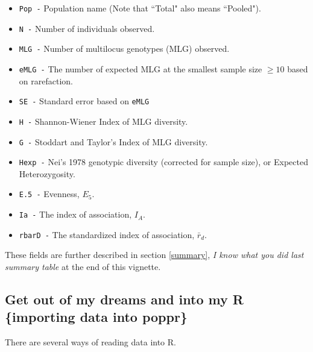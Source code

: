 \documentclass[letterpaper]{article}
\begin{document}
\begin{itemize}
  \item \texttt{Pop -} Population name (Note that ``Total" also means ``Pooled").
  \item \texttt{N -} Number of individuals observed.
  \item \texttt{MLG -} Number of multilocus genotypes (MLG) observed.
  \item \texttt{eMLG -} The number of expected MLG at the smallest sample size $\geq 10$ based on rarefaction. \cite{Hurlbert:1971}
  \item \texttt{SE -} Standard error based on \texttt{eMLG} \cite{Heck:1975}
  \item \texttt{H -} Shannon-Wiener Index of MLG diversity. \cite{Shannon:1948}
  \item \texttt{G -} Stoddart and Taylor's Index of MLG diversity. \cite{Stoddart:1988}
  \item \texttt{Hexp -} Nei's 1978 genotypic diversity (corrected for sample size), or  Expected Heterozygosity. \cite{Nei:1978}
  \item \texttt{E.5 -} Evenness, $E_5$. \cite{Pielou:1975}\cite{Ludwig:1988}\cite{Grunwald:2003}
  \item \texttt{Ia -} The index of association, $I_A$. \cite{Brown:1980} \cite{Smith:1993} \cite{Agapow:2001}
  \item \texttt{rbarD -} The standardized index of association, $\bar r_d$. \cite{Agapow:2001}
\end{itemize}
These fields are further described in section \ref{summary}, \textit{I know what you did last summary table} at the end of this vignette. 

\subsection{Get out of my dreams and into my R \{importing data into poppr\}}\label{intro:import}
There are several ways of reading data into R. 
\end{document}

